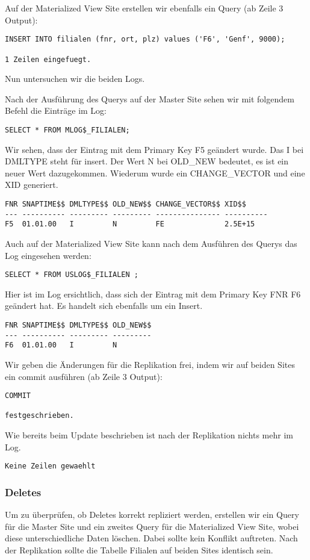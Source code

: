 \documentclass[11pt,a4paper,parskip=half]{scrartcl}
\begin{document}
Auf der Materialized View Site erstellen wir ebenfalls ein Query (ab Zeile 3 Output):
\begin{lstlisting}
INSERT INTO filialen (fnr, ort, plz) values ('F6', 'Genf', 9000);

1 Zeilen eingefuegt.
\end{lstlisting}

Nun untersuchen wir die beiden Logs.

Nach der Ausführung des Querys auf der Master Site sehen wir mit folgendem Befehl die Einträge im Log:
\begin{lstlisting}
SELECT * FROM MLOG$_FILIALEN;
\end{lstlisting}

Wir sehen, dass der Eintrag mit dem Primary Key F5 geändert wurde. Das I bei DMLTYPE steht für insert. Der Wert N bei OLD\_NEW bedeutet, es ist ein neuer Wert dazugekommen. Wiederum wurde ein CHANGE\_VECTOR und eine XID generiert.
\begin{lstlisting}
FNR SNAPTIME$$ DMLTYPE$$ OLD_NEW$$ CHANGE_VECTOR$$ XID$$
--- ---------- --------- --------- --------------- ----------
F5  01.01.00   I         N         FE              2.5E+15 
\end{lstlisting}

Auch auf der Materialized View Site kann nach dem Ausführen des Querys das Log eingesehen werden:
\begin{lstlisting}
SELECT * FROM USLOG$_FILIALEN ;
\end{lstlisting}

Hier ist im Log ersichtlich, dass sich der Eintrag mit dem Primary Key FNR F6 geändert hat. Es handelt sich ebenfalls um ein Insert.
\begin{lstlisting}
FNR SNAPTIME$$ DMLTYPE$$ OLD_NEW$$
--- ---------- --------- ---------
F6  01.01.00   I         N         
\end{lstlisting}

Wir geben die Änderungen für die Replikation frei, indem wir auf beiden Sites ein commit ausführen (ab Zeile 3 Output):
\begin{lstlisting}
COMMIT

festgeschrieben.
\end{lstlisting}

Wie bereits beim Update beschrieben ist nach der Replikation nichts mehr im Log.
\begin{lstlisting}
Keine Zeilen gewaehlt
\end{lstlisting}

\subsubsection{Deletes}
Um zu überprüfen, ob Deletes korrekt repliziert werden, erstellen wir ein Query für die Master Site und ein zweites Query für die Materialized View Site, wobei diese unterschiedliche Daten löschen. Dabei sollte kein Konflikt auftreten. Nach der Replikation sollte die Tabelle Filialen auf beiden Sites identisch sein.
\end{document}
